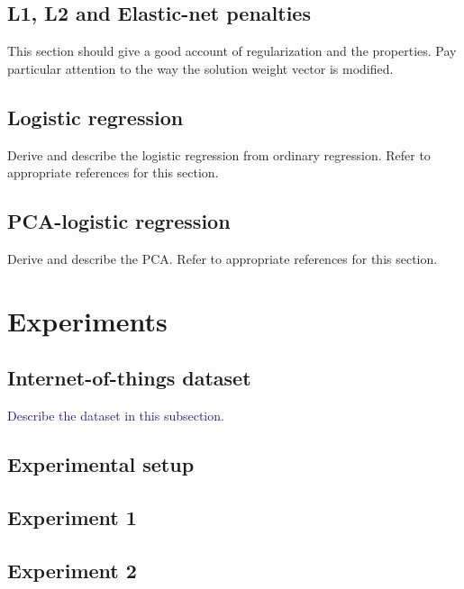 \documentclass[a4paper,10pt,twocolumn]{article}
\newcommand{\hilight}[2][MidnightBlue]{\textcolor{#1}{#2}}
\begin{document}
\lipsum[3]
\subsection{L1, L2 and Elastic-net penalties}
\hilight[BrickRed]{This section should give a good account of regularization and the properties. Pay particular attention to the way the solution weight vector is modified.}
\lipsum[3]
\subsection{Logistic regression}
\hilight[BrickRed]{Derive and describe the logistic regression from ordinary regression. Refer to appropriate references for this section.}
\lipsum[1]
\subsection{PCA-logistic regression}
\hilight[BrickRed]{Derive and describe the PCA. Refer to appropriate references for this section.}
\lipsum[4]
\section{Experiments}
\lipsum[4]

\subsection{Internet-of-things dataset}
\hilight{Describe the dataset in this subsection.}
\lipsum[2]
\subsection{Experimental setup}
\lipsum[4]
\subsection{Experiment 1}
\lipsum[4]
\subsection{Experiment 2}
\end{document}
